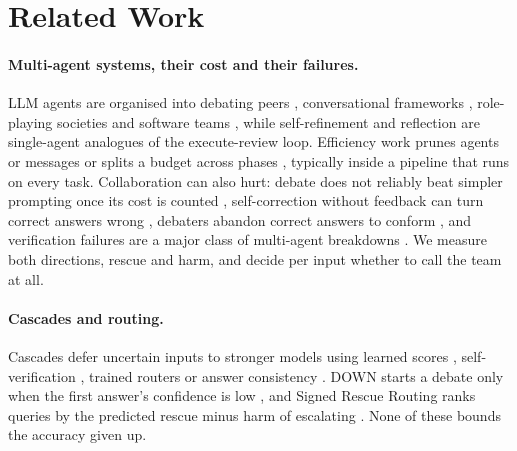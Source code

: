 \section{Related Work}

\paragraph{Multi-agent systems, their cost and their failures.}
LLM agents are organised into debating peers \citep{du2024debate,liang2024divergent}, conversational
frameworks \citep{wu2024autogen}, role-playing societies \citep{li2023camel} and software teams
\citep{hong2024metagpt,qian2024chatdev}, while self-refinement \citep{madaan2023selfrefine} and reflection
\citep{shinn2023reflexion} are single-agent analogues of the execute-review loop. Efficiency work prunes
agents or messages \citep{zhang2025agentprune,wang2025agentdropout,chen2025optima} or splits a budget
across phases \citep{hamri2026zebra,liu2025bats}, typically inside a pipeline that runs on every task.
Collaboration can also hurt: debate does not reliably beat simpler prompting once its cost is counted
\citep{smit2024mad}, self-correction without feedback can turn correct answers wrong \citep{huang2024selfcorrect},
debaters abandon correct answers to conform \citep{wynn2025talk}, and verification failures are a major
class of multi-agent breakdowns \citep{cemri2025mast}. We measure both directions, rescue and harm, and
decide per input whether to call the team at all.

\paragraph{Cascades and routing.}
Cascades defer uncertain inputs to stronger models using learned scores \citep{chen2023frugalgpt},
self-verification \citep{aggarwal2024automix}, trained routers \citep{ong2025routellm,ding2024hybrid} or
answer consistency \citep{yue2024cascades}. DOWN starts a debate only when the first answer's confidence
is low \citep{eo2025down}, and Signed Rescue Routing ranks queries by the predicted rescue minus harm of
escalating \citep{wang2026signedrescue}. None of these bounds the accuracy given up.

